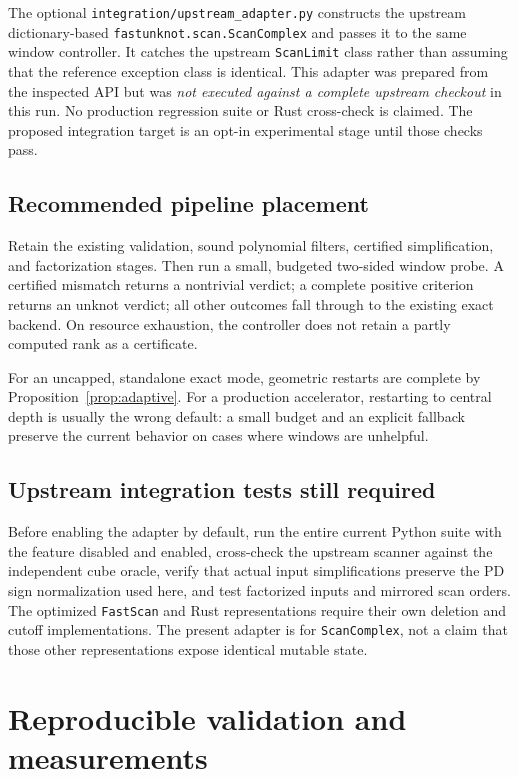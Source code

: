 \documentclass[11pt]{article}
\theoremstyle{definition}\newtheorem{definition}[theorem]{Definition}
\theoremstyle{remark}\newtheorem{remark}[theorem]{Remark}
\begin{document}
The optional \texttt{integration/upstream\_adapter.py} constructs the upstream dictionary-based \texttt{fastunknot.scan.ScanComplex} and passes it to the same window controller. It catches the upstream \texttt{ScanLimit} class rather than assuming that the reference exception class is identical. This adapter was prepared from the inspected API but was \emph{not executed against a complete upstream checkout} in this run. No production regression suite or Rust cross-check is claimed. The proposed integration target is an opt-in experimental stage until those checks pass.

\subsection{Recommended pipeline placement}
Retain the existing validation, sound polynomial filters, certified simplification, and factorization stages. Then run a small, budgeted two-sided window probe. A certified mismatch returns a nontrivial verdict; a complete positive criterion returns an unknot verdict; all other outcomes fall through to the existing exact backend. On resource exhaustion, the controller does not retain a partly computed rank as a certificate.

For an uncapped, standalone exact mode, geometric restarts are complete by Proposition~\ref{prop:adaptive}. For a production accelerator, restarting to central depth is usually the wrong default: a small budget and an explicit fallback preserve the current behavior on cases where windows are unhelpful.

\subsection{Upstream integration tests still required}
Before enabling the adapter by default, run the entire current Python suite with the feature disabled and enabled, cross-check the upstream scanner against the independent cube oracle, verify that actual input simplifications preserve the PD sign normalization used here, and test factorized inputs and mirrored scan orders. The optimized \texttt{FastScan} and Rust representations require their own deletion and cutoff implementations. The present adapter is for \texttt{ScanComplex}, not a claim that those other representations expose identical mutable state.

\section{Reproducible validation and measurements}
\label{sec:experiments}
\end{document}
